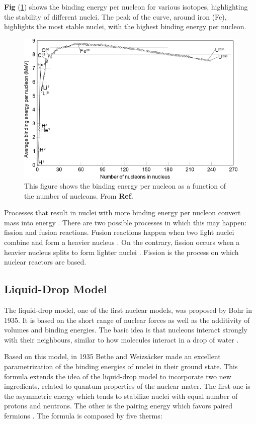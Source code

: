 \textbf{Fig} (\ref{fig:BE_energy_per_nucleon}) shows the binding energy per nucleon for various isotopes, highlighting the stability of different nuclei. The peak of the curve, around iron (Fe), highlights the most stable nuclei, with the highest binding energy per nucleon.

\begin{figure}[h]
    \centering
    \includegraphics[width=0.75\linewidth]{Kap2/Figures/Binding_energy_curve_-_common_isotopes.png}
    \caption{This figure shows the binding energy per nucleon as a function of the number of nucleons. From \textbf{Ref.} \cite{BEPN_figure}}
    \label{fig:BE_energy_per_nucleon}
\end{figure}

Processes that result in nuclei with more binding energy per nucleon convert mass into energy \cite{Stacey_2010}. There are two possible processes in which this may happen: fission and fusion reactions. Fusion reactions happen when two light nuclei combine and form a heavier nucleus \cite{Lewis_2014}. On the contrary, fission occurs when a heavier nucleus splits to form lighter nuclei \cite{Stacey_2010}. Fission is the process on which nuclear reactors are based.

\subsection{Liquid-Drop Model}
The liquid-drop model, one of the first nuclear models, was proposed by Bohr in 1935. It is based on the short range of nuclear forces as well as the additivity of volumes and binding energies. The basic idea is that nucleons interact strongly with their neighbours, similar to how molecules interact in a drop of water \cite{Spiro}.

Based on this model, in 1935 Bethe and Weizs\"{a}cker made an excellent parametrization of the binding energies of nuclei in their ground state. This formula extends the idea of the liquid-drop model to incorporate two new ingredients, related to quantum properties of the nuclear mater. The first one is the asymmetric energy which tends to stabilize nuclei with equal number of protons and neutrons. The other is the pairing energy which favors paired fermions \cite{Spiro}. The formula is composed by five therms:

